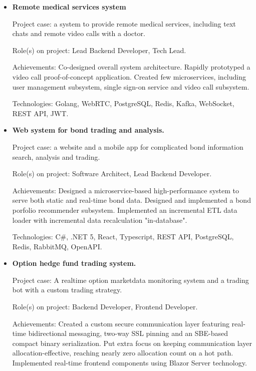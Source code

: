 \documentclass{article}
\begin{document}
\begin{itemize}
    \item {
        \textbf{Remote medical services system}
        
        Project case: a system to provide remote medical services, including text chats and remote video calls with a doctor.
        
        Role(s) on project: Lead Backend Developer, Tech Lead.
        
        Achievements:
        Co-designed overall system architecture.
        Rapidly prototyped a video call proof-of-concept application.
        Created few microservices, including user management subsystem, single sign-on service and video call subsystem.
        
        Technologies: Golang, WebRTC, PostgreSQL, Redis, Kafka, WebSocket, REST API, JWT.
    }
    \item {
        \textbf{Web system for bond trading and analysis.}
        
        Project case: a website and a mobile app for complicated bond information search, analysis and trading.
        
        Role(s) on project: Software Architect, Lead Backend Developer.
        
        Achievements:
        Designed a microservice-based high-performance system to serve both static and real-time bond data.
        Designed and implemented a bond porfolio recommender subsystem.
        Implemented an incremental ETL data loader with incremental data recalculation "in-database".
        
        Technologies: C\#, .NET 5, React, Typescript, REST API, PostgreSQL, Redis, RabbitMQ, OpenAPI.
    }
    \item {
        \textbf{Option hedge fund trading system.}
        
        Project case: A realtime option marketdata monitoring system and a trading bot with a custom trading strategy.
        
        Role(s) on project: Backend Developer, Frontend Developer.
        
        Achievements:
        Created a custom secure communication layer featuring real-time bidirectional messaging, two-way SSL pinning and an SBE-based compact binary serialization.
        Put extra focus on keeping communication layer allocation-effective, reaching nearly zero allocation count on a hot path.
        Implemented real-time frontend components using Blazor Server technology.
        
}
\end{itemize}
\end{document}
